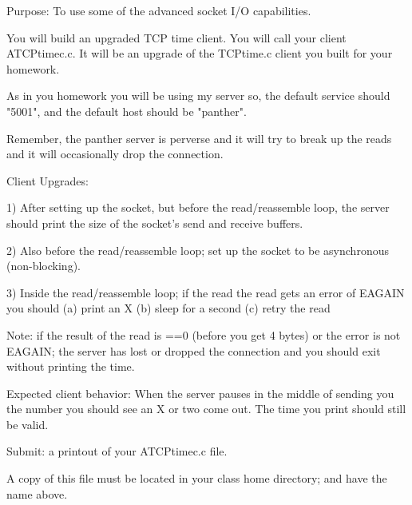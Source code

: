 

\parindent 0pt

Purpose: To use some of the advanced socket I/O capabilities.

You will build an upgraded TCP time client.
You will call your client {\ltt{}ATCPtimec.c}.
It will be an upgrade of the {\ltt{}TCPtime.c} client you built
for your homework.

As in you homework you will be using my server so,
the default service should {\ltt{}"5001"},
and the default host should be {\ltt{}"panther"}.

Remember, the {\ltt{}panther} server is perverse and it will try
to break up the reads and it will occasionally drop the connection.

Client Upgrades:

1) After setting up the socket, but before the read/reassemble loop,
the server should print the size of the socket's
send and receive buffers.

2) Also before the read/reassemble loop; set up the socket to be asynchronous
(non-blocking).

3) Inside the read/reassemble loop; if the read
the read gets an error of {\ltt{}EAGAIN} you should 
(a) print an {\ltt{}X}
(b) sleep for a second
(c) retry the read

Note: if the result of the read is {\ltt{}==0} (before you get 4 bytes)
or the error is not {\ltt{}EAGAIN}; the server has lost or dropped the
connection and you should exit without printing the time.

Expected client behavior:
When the server pauses in the middle of sending you the number
you should see an {\ltt{}X} or two come out.
The time you print should still be valid.

Submit: a printout of your {\ltt{}ATCPtimec.c} file.

A copy of this file must be located in your class home directory;
and have the name above.

\bye

